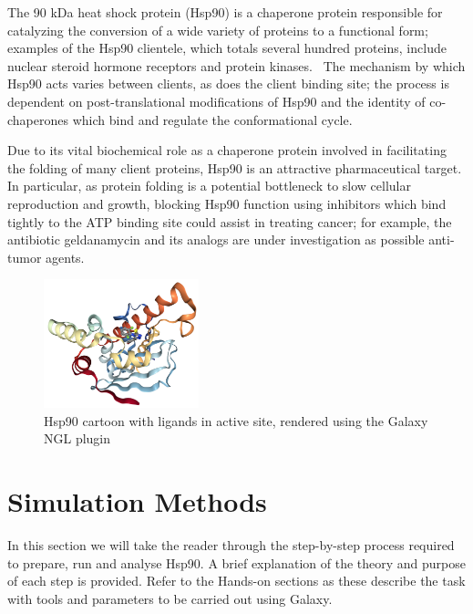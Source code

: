 \documentclass[twocolumn]{bmcart}%
\begin{document}
The 90 kDa heat shock protein (Hsp90) is a chaperone protein responsible
for catalyzing the conversion of a wide variety of proteins to a
functional form; examples of the Hsp90 clientele, which totals several
hundred proteins, include nuclear steroid hormone receptors and protein
kinases.~\cite{Pearl2006} The mechanism by which Hsp90 acts varies between clients, as
does the client binding site; the process is dependent on
post-translational modifications of Hsp90 and the identity of
co-chaperones which bind and regulate the conformational cycle.

Due to its vital biochemical role as a chaperone protein involved in
facilitating the folding of many client proteins, Hsp90 is an attractive
pharmaceutical target. In particular, as protein folding is a potential
bottleneck to slow cellular reproduction and growth, blocking Hsp90
function using inhibitors which bind tightly to the ATP binding site
could assist in treating cancer; for example, the antibiotic
geldanamycin and its analogs are under investigation as possible
anti-tumor agents.

\begin{figure}[h!]
  \includegraphics[width=0.4\textwidth]{hsp90lig}
    \caption{
    Hsp90 cartoon with ligands in active site, rendered using the Galaxy NGL plugin~\cite{Rose2018ngl}}
\label{fig:Hsp90}
 \end{figure}

\hypertarget{methods}{%
\section*{Simulation Methods}\label{methods}}
In this section we will take the reader through the step-by-step process required to prepare, run and analyse Hsp90. A brief explanation of the theory and purpose of each step is provided. Refer to the Hands-on sections as these describe the task with tools and parameters to be carried out using Galaxy. 

\end{document}

